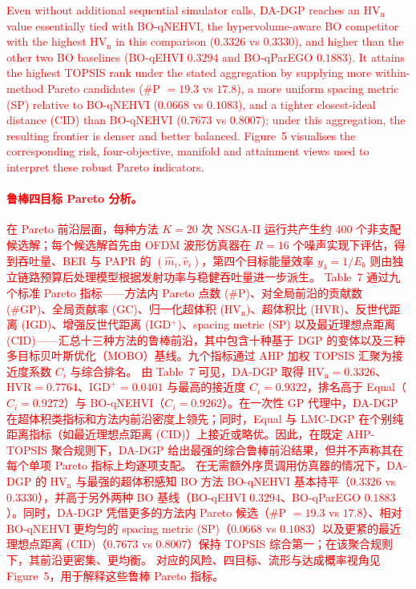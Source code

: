 \documentclass[11pt]{article}
\begin{document}
\textcolor{red}{Even without additional sequential simulator calls, DA-DGP reaches an $\mathrm{HV}_{\mathrm{n}}$ value essentially tied with BO-qNEHVI, the hypervolume-aware BO competitor with the highest $\mathrm{HV}_{\mathrm{n}}$ in this comparison ($0.3326$ vs $0.3330$), and higher than the other two BO baselines (BO-qEHVI $0.3294$ and BO-qParEGO $0.1883$). It attains the highest TOPSIS rank under the stated aggregation by supplying more within-method Pareto candidates (\#P $=19.3$ vs $17.8$), a more uniform spacing metric (SP) relative to BO-qNEHVI ($0.0668$ vs $0.1083$), and a tighter closest-ideal distance (CID) than BO-qNEHVI ($0.7673$ vs $0.8007$); under this aggregation, the resulting frontier is denser and better balanced.}%
\textcolor{red}{Figure~5 visualises the corresponding risk, four-objective, manifold and attainment views used to interpret these robust Pareto indicators.}%

\textcolor{red}{\paragraph{鲁棒四目标 Pareto 分析。}}%
\textcolor{red}{在 Pareto 前沿层面，每种方法 $K=20$ 次 NSGA-II 运行共产生约 $400$ 个非支配候选解；每个候选解首先由 OFDM 波形仿真器在 $R=16$ 个噪声实现下评估，得到吞吐量、BER 与 PAPR 的 $(\hat{m}_{i},\hat{v}_{i})$，第四个目标能量效率 $y_{4}=1/E_{b}$ 则由独立链路预算后处理模型根据发射功率与稳健吞吐量进一步派生。}%
\textcolor{red}{Table~7 通过九个标准 Pareto 指标——方法内 Pareto 点数 (\#P)、对全局前沿的贡献数 (\#GP)、全局贡献率 (GC)、归一化超体积 ($\mathrm{HV}_{\mathrm{n}}$)、超体积比 (HVR)、反世代距离 (IGD)、增强反世代距离 (IGD$^{+}$)、spacing metric (SP) 以及最近理想点距离 (CID)——汇总十三种方法的鲁棒前沿，其中包含十种基于 DGP 的变体以及三种多目标贝叶斯优化（MOBO）基线。九个指标通过 AHP 加权 TOPSIS 汇聚为接近度系数 $C_{i}$ 与综合排名。}%
\textcolor{red}{由 Table~7 可见，DA-DGP 取得 $\mathrm{HV}_{\mathrm{n}}=0.3326$、$\mathrm{HVR}=0.7764$、$\mathrm{IGD}^{+}=0.0401$ 与最高的接近度 $C_{i}=0.9322$，排名高于 Equal（$C_{i}=0.9272$）与 BO-qNEHVI（$C_{i}=0.9262$）。在一次性 GP 代理中，DA-DGP 在超体积类指标和方法内前沿密度上领先；同时，Equal 与 LMC-DGP 在个别纯距离指标（如最近理想点距离 (CID)）上接近或略优。因此，在既定 AHP-TOPSIS 聚合规则下，DA-DGP 给出最强的综合鲁棒前沿结果，但并不声称其在每个单项 Pareto 指标上均逐项支配。}%
\textcolor{red}{在无需额外序贯调用仿真器的情况下，DA-DGP 的 $\mathrm{HV}_{\mathrm{n}}$ 与最强的超体积感知 BO 方法 BO-qNEHVI 基本持平（$0.3326$ vs $0.3330$），并高于另外两种 BO 基线（BO-qEHVI $0.3294$、BO-qParEGO $0.1883$）。同时，DA-DGP 凭借更多的方法内 Pareto 候选（\#P $=19.3$ vs $17.8$）、相对 BO-qNEHVI 更均匀的 spacing metric (SP)（$0.0668$ vs $0.1083$）以及更紧的最近理想点距离 (CID)（$0.7673$ vs $0.8007$）保持 TOPSIS 综合第一；在该聚合规则下，其前沿更密集、更均衡。}%
\textcolor{red}{对应的风险、四目标、流形与达成概率视角见 Figure~5，用于解释这些鲁棒 Pareto 指标。}%
\end{document}
